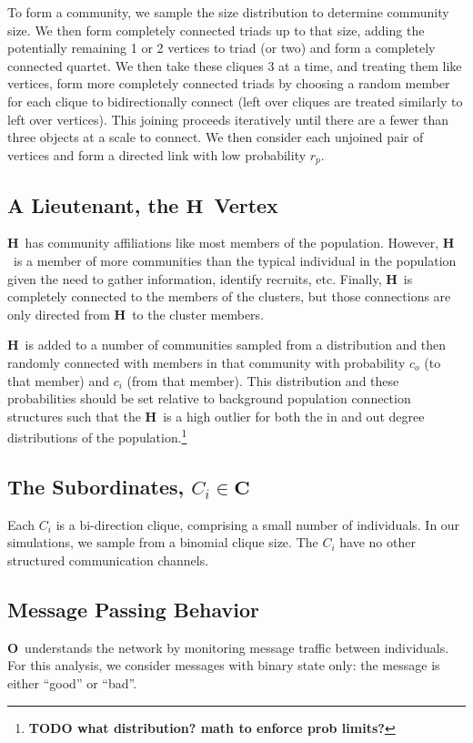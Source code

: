 \documentclass{article}
\newcommand{\Hub}[0]{\ensuremath{\mathbf{H}}}
\newcommand{\Obs}[0]{\ensuremath{\mathbf{O}}}
\begin{document}
To form a community, we sample the size distribution to determine community size.  We then form completely connected triads up to that size, adding the potentially remaining 1 or 2 vertices to triad (or two) and form a completely connected quartet.  We then take these cliques 3 at a time, and treating them like vertices, form more completely connected triads by choosing a random member for each clique to bidirectionally connect (left over cliques are treated similarly to left over vertices).  This joining proceeds iteratively until there are a fewer than three objects at a scale to connect.  We then consider each unjoined pair of vertices and form a directed link with low probability $r_p$.

\subsection*{A Lieutenant, the \Hub\ Vertex}
\Hub\ has community affiliations like most members of the population.  However, \Hub\ is a member of more communities than the typical individual in the population given the need to gather information, identify recruits, etc.  Finally, \Hub\ is completely connected to the members of the clusters, but those connections are only directed from \Hub\ to the cluster members.

\Hub\ is added to a number of communities sampled from a distribution and then randomly connected with members in that community with probability $c_o$ (to that member) and $c_i$ (from that member).  This distribution and these probabilities should be set relative to background population connection structures such that the \Hub\ is a high outlier for both the in and out degree distributions of the population.\footnote{{\bf TODO what distribution? math to enforce prob limits?}}

\subsection*{The Subordinates, $C_i\in\mathbf{C}$}
Each $C_i$ is a bi-direction clique, comprising a small number of individuals.  In our simulations, we sample from a binomial clique size.  The $C_i$ have no other structured communication channels.

\subsection*{Message Passing Behavior}
\Obs\ understands the network by monitoring message traffic between individuals.  For this analysis, we consider messages with binary state only: the message is either ``good'' or ``bad''.
\end{document}

